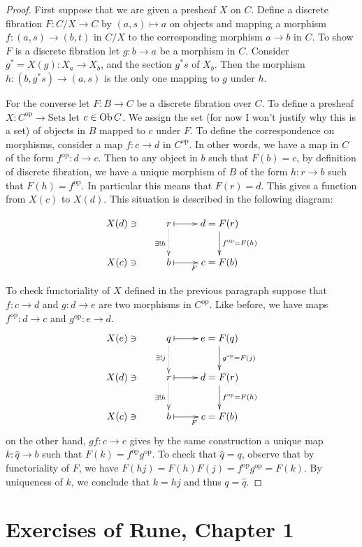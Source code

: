 \begin{proof}
First suppose that we are given a presheaf $X$ on $C$. Define a discrete
fibration $F:C/X \to C$ by $(a,s)\mapsto a$ on objects and
mapping a morphism $f:(a,s)\to (b,t)$ in $C/X$ to the
corresponding morphism $a \to b$ in $C$.
To show $F$ is a discrete fibration 
let $g:b\to a$ be a morphism in $C$. 
Consider $g^*=X(g):X_a\to X_b$,
and the section $g^*s$ of $X_b$.
Then the
morphism $h:(b,g^*s)\to (a,s)$ is the only one mapping to $g$ under $h$.

For the converse let $F:B \to C$ be a discrete fibration over $C$.
To define a presheaf $X:C^{\text{op}}\to \text{Sets}$ let $c \in \mathop{\mathrm{Ob}}\nolimits C$.
We assign the set (for now I won't justify why this is a set)
of objects in $B$ mapped to $c$ under $F$.
To define the correspondence on morphisms, 
consider a map $f:c \to d$ in $C^{\text{op}}$.
In other words, we have a map in  $C$ of the form $f^{\text{op}}:d \to c$.
Then to any object in $b$ such that $F(b)=c$,
by definition of discrete fibration,
we have a unique morphism of $B$ of the form
$h:r \to b$ such that $F(h)=f^{\text{op}}$.
In particular this means that $F(r)=d$.
This gives a function from $X(c)$ to $X(d)$.
This situation is described in the following diagram:

$$
\xymatrix{
X(d)\ni&r \ar@{.>}[d]_{\exists!h}\ar@{|->}[r]& d=F(r)
\ar[d]^{f^{\text{op}}=F(h)}\\
X(c)\ni& b\ar@{|->}[r]_F&c=F(b)
}
$$




To check functoriality of $X$ defined in the previous paragraph
suppose that $f:c\to d$ and $g:d\to e$ are two morphisms in $C^{\text{op}}$.
Like before, we have maps $f^{\text{op}}:d\to c$ and $g^{\text{op}}:e \to d$.
$$
\xymatrix{
X(e)\ni& q\ar@{.>}[d]_{\exists !j}\ar@{|->}[r]& e=F(q)
\ar[d]^{g^{\text{op}}=F(j)}\\
X(d)\ni&r \ar@{.>}[d]_{\exists!h}\ar@{|->}[r]& d=F(r)
\ar[d]^{f^{\text{op}}=F(h)}\\
X(c)\ni& b\ar@{|->}[r]_F&c=F(b)
}
$$
on the other hand, $gf:c \to e$ gives by the
same construction a unique map $k:\hat{q}  \to b$
such that $F(k)=f^{\text{op}}g^{\text{op}}$.
To check that $\hat{q}=q$, observe that
by functoriality of $F$, we have
$F(hj)=F(h)F(j)=f^{\text{op}}g^{\text{op}}=F(k)$.
By uniqueness of $k$, we conclude that
$k=hj$ and thus $q=\hat{q}$.
\end{proof}

\section{Exercises of Rune, Chapter 1}
\label{section-exercises-of-Rune-Chapter-1}

